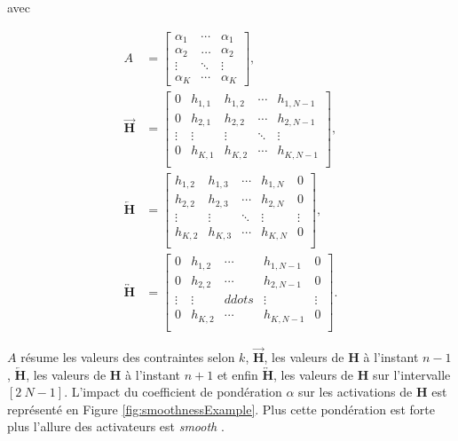 avec 

\begin{subequations}
\begin{align}
    A &= 
\begin{bmatrix} 
\alpha_1 &  \cdots & \alpha_1  \\ 
\alpha_2 & \dots & \alpha_2  \\ 
\vdots & \ddots &  \vdots \\
\alpha_K & \cdots & \alpha_K
\end{bmatrix}, \label{eq:subeq1}\\
    \overrightarrow{\mathbf{H}} &= 
\begin{bmatrix}
0 & h_{1,1} & h_{1,2} & \cdots & h_{1,N-1}\\
0 & h_{2,1} & h_{2,2} & \cdots & h_{2,N-1}\\
\vdots & \vdots & \vdots & \ddots & \vdots\\
0 & h_{K,1} & h_{K,2} & \cdots & h_{K,N-1}\\
\end{bmatrix}, \label{eq:subeq2}\\
    \overleftarrow{\mathbf{H}} &= 
\begin{bmatrix}
h_{1,2} & h_{1,3} & \cdots & h_{1,N} & 0\\
h_{2,2} & h_{2,3} & \cdots & h_{2,N} & 0\\
\vdots & \vdots & \ddots & \vdots & \vdots\\
h_{K,2} & h_{K,3} & \cdots & h_{K,N} & 0\\
\end{bmatrix}, \label{eq:subeq3}\\
    \overleftrightarrow{\mathbf{H}} &= 
\begin{bmatrix}
0 & h_{1,2} & \cdots & h_{1,N-1} & 0\\
0 & h_{2,2} & \cdots & h_{2,N-1} & 0\\
\vdots & \vdots & ddots & \vdots & \vdots\\
0 & h_{K,2} & \cdots & h_{K,N-1} & 0\\
\end{bmatrix}. \label{eq:subeq5}
\end{align}
\end{subequations}

$A$ résume les valeurs des contraintes selon $k$, $\overrightarrow{\mathbf{H}}$, les valeurs de $\mathbf{H}$ à l'instant $n-1$, $\overleftarrow{\mathbf{H}}$, les valeurs de $\mathbf{H}$ à l'instant $n+1$ et enfin $\overleftrightarrow{\mathbf{H}}$, les valeurs de $\mathbf{H}$ sur l'intervalle $\left[2~N-1 \right]$. L'impact du coefficient de pondération $\alpha$ sur les activations de $\mathbf{H}$ est représenté en Figure \ref{fig:smoothnessExample}. Plus cette pondération est forte plus l'allure des activateurs est \textit{smooth} .

